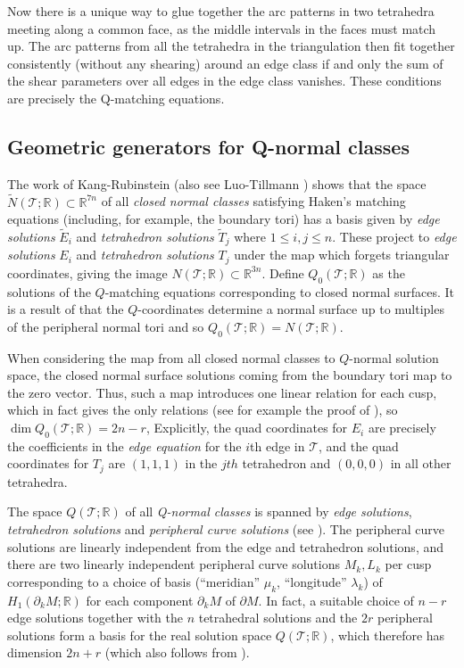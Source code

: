 \documentclass[12pt,reqno]{amsart}  %
\theoremstyle{definition}
\theoremstyle{remark}
\def\R{\mathbb{R}}
\newcommand{\T}{\mathcal{T}}
\def\bd{\partial}
\newcommand{\sect}{\textsection}
\begin{document}
Now there is a unique way to glue together the arc patterns in two 
tetrahedra meeting along a common face, as the middle intervals in the faces 
must match up. The arc patterns from all the tetrahedra in the triangulation 
then fit together consistently (without any shearing) around an edge class 
if and only the sum of the shear parameters over all edges in the edge 
class vanishes. These conditions are precisely the Q-matching equations.

\subsection{Geometric generators for Q-normal classes}

The work of Kang-Rubinstein \cite[Theorem 2.1]{KR1} (also see 
Luo-Tillmann \cite[\sect2]{LT}) shows that the space 
$\tilde N(\T;\R) \subset \R^{7n}$  of all {\em closed normal classes} 
satisfying Haken's matching equations (including, for example, the 
boundary tori) has a basis given by {\em edge solutions} $\tilde E_i$ and 
{\em tetrahedron solutions} $\tilde T_j$ where $1\le i ,j \le n$. 
These project to {\em edge solutions} $E_i$ and {\em tetrahedron solutions} 
$T_j$ under the map which forgets triangular coordinates, giving the image $N(\T;\R) \subset \R^{3n}$. Define $Q_0(\T;\R)$ as the solutions of the $Q$-matching equations corresponding to closed normal surfaces. It is a result of \cite{To} that the $Q$-coordinates determine a normal surface up to multiples of the peripheral normal tori and so $Q_0(\T;\R)=N(\T;\R)$.

When considering the map from all 
closed normal classes to $Q$-normal solution space, the closed normal 
surface solutions coming from the boundary tori map to the zero vector. 
Thus, such a map introduces one linear relation for each cusp, which in fact 
gives the only relations (see for example the proof of \cite[Theorem 3.1]{KR1}), 
so $\dim Q_0(\T;\R) = 2n-r$,
Explicitly, the quad coordinates for $E_i$ are 
precisely the coefficients in the {\em edge equation} for the $i$th edge 
in $\T$, and the quad coordinates for $T_j$ are $(1,1,1)$ in the $jth$ 
tetrahedron and $(0,0,0)$ in all other tetrahedra. 

The space $Q(\T;\R)$ of all {\em Q-normal classes} is spanned by 
{\em edge solutions}, {\em tetrahedron solutions} and 
{\em peripheral curve solutions} (see \cite[Theorem 3.1]{KR1}).     
The peripheral curve solutions are linearly independent from the
edge and tetrahedron solutions, and there are two linearly independent 
peripheral curve solutions $M_k, L_k$ per cusp corresponding to a choice of 
basis (``meridian'' $\mu_k$, ``longitude'' $\lambda_k$) 
of $H_1(\bd_k M;\R)$ for each component $\bd_k M$ of $\bd M$. 
In fact, a suitable choice of $n-r$ edge solutions together with the $n$ 
tetrahedral solutions and the $2r$ peripheral solutions form a basis for 
the real solution space $Q(\T;\R)$, which therefore has dimension $2n+r$ 
(which also follows from \cite[Theorem 3.1]{KR1}). 
 
\end{document}
